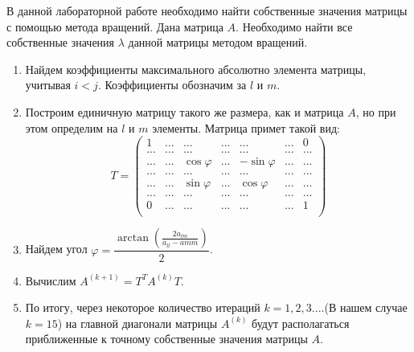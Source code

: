 \documentclass[14pt, a4paper, fleqn]{extarticle}
\begin{document}
	\tableofcontents
	\pagebreak
	В данной лабораторной работе необходимо найти собственные значения матрицы с помощью метода вращений.
	Дана матрица $A$. Необходимо найти все собственные значения $\lambda$ данной матрицы методом вращений.
		\begin{enumerate}
			\item Найдем коэффициенты максимального абсолютно	 элемента матрицы, учитывая $i < j$. Коэффициенты обозначим за $l$ и $m$.
			\item Построим единичную матрицу такого же размера, как и матрица $A$, но при этом определим на $l$ и $m$ элементы. Матрица примет такой вид:
			$$ T = 
			\begin{pmatrix}
				1 & ... & ... & ... & ... & ... & 0 \\
				... & ... & ... & ... & ... & ... & ... \\
				... & ... & \cos \varphi & ... & -\sin \varphi & ... & ... \\
				... & ... & ... & ... & ... & ... & ... \\
				... & ... & \sin \varphi & ... & \cos \varphi & ... & ... \\
				... & ... & ... & ... & ... & ... & ... \\
				0 & ... & ... & ... & ... & ... & 1 \\
			\end{pmatrix}
			$$
			\item Найдем угол $\varphi = \dfrac{\arctan\left( \frac{2a_{lm}}{a_{ll} - a{mm}} \right) }{2} $.
			\item Вычислим $A^{(k+1)} = T^TA^{(k)}T $.
			\item По итогу, через некоторое количество итераций  $k = 1, 2, 3....$(В нашем случае $k  = 15$) на главной диагонали матрицы $A^{(k)}$ будут располагаться приближенные к точному собственные значения матрицы $A$.
		\end{enumerate}
	
\end{document}

